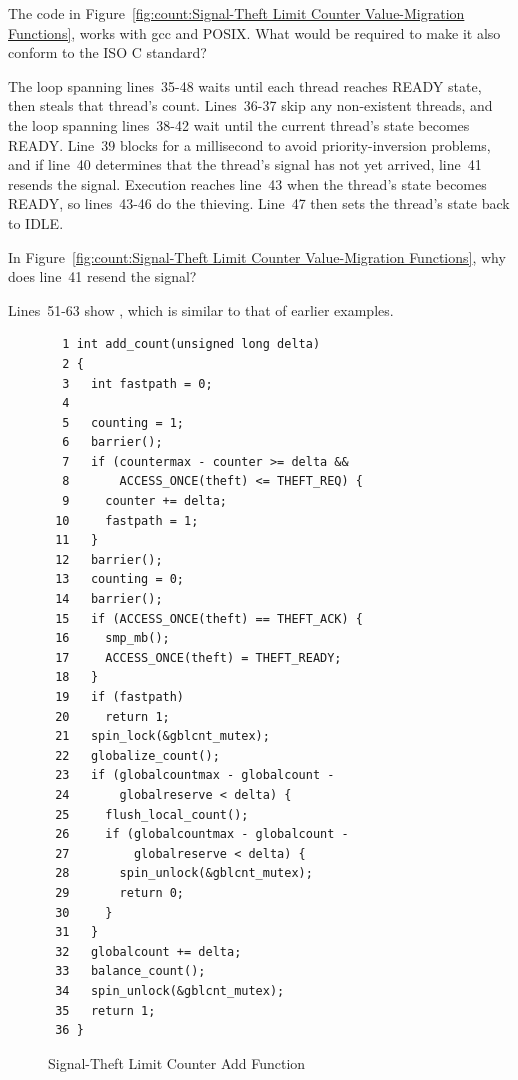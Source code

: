 \QuickQuiz{}
	The code in
	Figure~\ref{fig:count:Signal-Theft Limit Counter Value-Migration Functions},
	works with gcc and POSIX.
	What would be required to make it also conform to the ISO C standard?
 \QuickQuizEnd

The loop spanning lines~35-48 waits until each thread reaches READY state,
then steals that thread's count.
Lines~36-37 skip any non-existent threads, and the loop spanning
lines~38-42 wait until the current thread's  state becomes READY.
Line~39 blocks for a millisecond to avoid priority-inversion problems,
and if line~40 determines that the thread's signal has not yet arrived,
line~41 resends the signal.
Execution reaches line~43 when the thread's  state becomes
READY, so lines~43-46 do the thieving.
Line~47 then sets the thread's  state back to IDLE.

\QuickQuiz{}
	In Figure~\ref{fig:count:Signal-Theft Limit Counter Value-Migration Functions}, why does line~41 resend the signal?
 \QuickQuizEnd

Lines~51-63 show , which is similar to that of
earlier examples.

\begin{figure}[tbp]
{ \scriptsize
\begin{verbatim}
  1 int add_count(unsigned long delta)
  2 {
  3   int fastpath = 0;
  4 
  5   counting = 1;
  6   barrier();
  7   if (countermax - counter >= delta &&
  8       ACCESS_ONCE(theft) <= THEFT_REQ) {
  9     counter += delta;
 10     fastpath = 1;
 11   }
 12   barrier();
 13   counting = 0;
 14   barrier();
 15   if (ACCESS_ONCE(theft) == THEFT_ACK) {
 16     smp_mb();
 17     ACCESS_ONCE(theft) = THEFT_READY;
 18   }
 19   if (fastpath)
 20     return 1;
 21   spin_lock(&gblcnt_mutex);
 22   globalize_count();
 23   if (globalcountmax - globalcount -
 24       globalreserve < delta) {
 25     flush_local_count();
 26     if (globalcountmax - globalcount -
 27         globalreserve < delta) {
 28       spin_unlock(&gblcnt_mutex);
 29       return 0;
 30     }
 31   }
 32   globalcount += delta;
 33   balance_count();
 34   spin_unlock(&gblcnt_mutex);
 35   return 1;
 36 }
\end{verbatim}
}
\caption{Signal-Theft Limit Counter Add Function}
\label{fig:count:Signal-Theft Limit Counter Add Function}
\end{figure}

